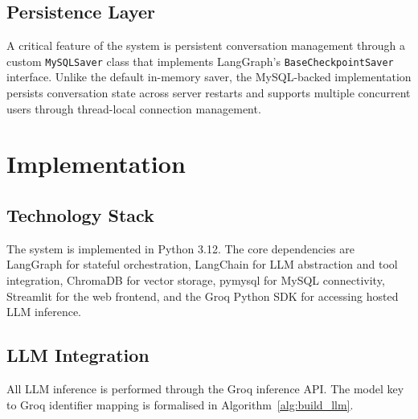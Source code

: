 \documentclass[12pt,a4paper]{article}
\begin{document}
\subsection{Persistence Layer}

A critical feature of the system is persistent conversation management through a custom \texttt{MySQLSaver} class that implements LangGraph's \texttt{BaseCheckpointSaver} interface. Unlike the default in-memory saver, the MySQL-backed implementation persists conversation state across server restarts and supports multiple concurrent users through thread-local connection management.

\section{Implementation}

\subsection{Technology Stack}

The system is implemented in Python 3.12. The core dependencies are LangGraph for stateful orchestration, LangChain for LLM abstraction and tool integration, ChromaDB for vector storage, pymysql for MySQL connectivity, Streamlit for the web frontend, and the Groq Python SDK for accessing hosted LLM inference.

\subsection{LLM Integration}

All LLM inference is performed through the Groq inference API. The model key to Groq identifier mapping is formalised in Algorithm~\ref{alg:build_llm}.
\end{document}

